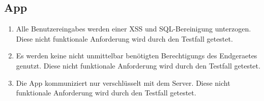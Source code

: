\subsection*{App}

\begin{samepage}
    \begin{enumerate}[label=\textbf{/NFS\arabic*0/}, align=left]
        \item \label{/NFS10/} Alle \Glspl{Benutzereingabe} werden einer \Gls{XSS} und \Gls{SQL}-Bereinigung unterzogen. Diese nicht funktionale Anforderung wird durch den Testfall  getestet.
        \item \label{/NFS20/} Es werden keine nicht unmittelbar benötigten \Glspl{Berechtigung} des \Gls{Endgeraet}es genutzt. Diese nicht funktionale Anforderung wird durch den Testfall  getestet.
        \item \label{/NFS30/} Die App kommuniziert nur verschlüsselt mit dem \Gls{Server}. Diese nicht funktionale Anforderung wird durch den Testfall  getestet.
    \end{enumerate}
\end{samepage}